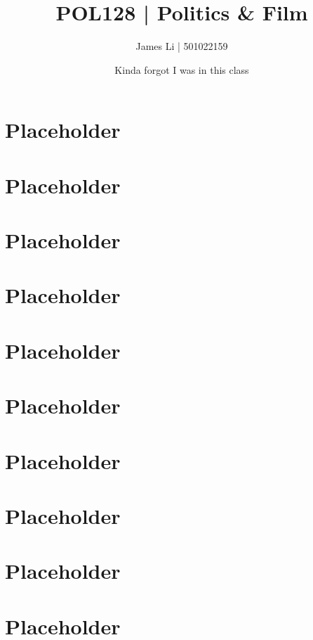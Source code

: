 \documentclass[a4paper]{article}
\title{POL128 | Politics \& Film}
\author{James Li | 501022159}
\date{Kinda forgot I was in this class}
\begin{document}
  \maketitle
  \tableofcontents
  \newpage
  \section{Placeholder} 
  \section{Placeholder} 
  \section{Placeholder} 
  \section{Placeholder} 
  \section{Placeholder} 
  \section{Placeholder} 
  \section{Placeholder} 
  \section{Placeholder} 
  \section{Placeholder} 
  \section{Placeholder} 
\end{document}

